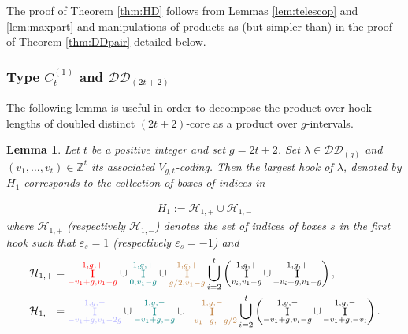 \documentclass[11pt,letterpaper]{amsart}
\def\bbbz{\mathbb Z}
\def\cch{\mathcal H}
\def\ccsc{\mathcal {SC}}
\def\ccdd{\mathcal {DD}}
\newtheorem{lm}[df]{Lemma}
\DeclareMathOperator{\I}{I}
\numberwithin{equation}{section}
\numberwithin{df}{section}
\begin{document}
The proof of Theorem \ref{thm:HD} follows from Lemmas \ref{lem:telescop} and \ref{lem:maxpart} and manipulations of products as (but simpler than) in the proof of Theorem \ref{thm:DDpair} detailed below.




\subsubsection{Type $C^{(1)}_{t}$ and $\ccdd_{(2t+2)}$}
 The following lemma is useful in order to decompose the product over hook lengths of doubled distinct $(2t+2)$-core as a product over $g$-intervals.



\begin{lm}\label{lem:maxhook}
Let $t$ be a positive integer and set $g=2t+2$. Set $\lambda\in \ccdd_{(g)}$ and $(v_1,\dots,v_{t})\in\bbbz^t$ its associated $V_{g,t}$-coding. Then the largest hook of $\lambda$, denoted by $H_1$ corresponds to the collection of boxes of indices in

\begin{align*}
H_1:=\cch_{1,+}\cup\cch_{1,-}
\end{align*}
where $\cch_{1,+}$ (respectively $\cch_{1,-}$) denotes the set of indices of boxes $s$ in the first hook such that $\varepsilon_s=1$ (respectively $\varepsilon_s=-1$) and
\begin{align*}
\cch_{1,+}&=\textcolor{red}{\I_{-v_1+g,v_1-g}^{1,g,+}}  \cup \textcolor{teal}{\I_{0,v_1-g}^{1,g,+}} \cup\textcolor{brown}{\I_{g/2,v_1-g}^{1,g,+}}
 \displaystyle\bigcup_{i=2}^{t}\left(\I_{v_i,v_1-g}^{1,g,+}\cup \I_{-v_i+g,v_1-g}^{1,g,+}\right),\\
\cch_{1,-}&= \textcolor{blue!30}{\I_{-v_1+g,v_1-2g}^{1,g,-}} \cup\textcolor{teal}{\I_{-v_1+g,-g}^{1,g,-}}\cup\textcolor{brown}{\I_{-v_1+g, -g/2}^{1,g,-}} \displaystyle\bigcup_{i=2}^{t}\left(\I_{-v_1+g,v_i-g}^{1,g,-}\cup \I_{-v_1+g,-v_i}^{1,g,-}\right).
\end{align*}

\end{lm}
\end{document}
